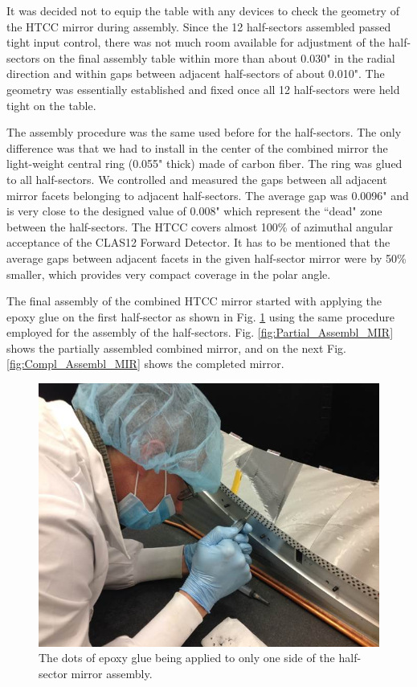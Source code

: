 It was decided not to equip the table with any devices to check the geometry of the HTCC mirror during assembly. Since the 12 half-sectors assembled passed tight input control, there was not much room available for adjustment of the half-sectors on the final assembly table within more than about 0.030" in the radial direction and within gaps between adjacent half-sectors of about 0.010". The geometry was essentially established and fixed once all 12 half-sectors were held tight on the table.

The assembly procedure was the same used before for the half-sectors. The only difference was that we had to install in the center of the combined mirror the light-weight central ring (0.055" thick) made of carbon fiber. The ring was glued to all half-sectors. We controlled and measured the gaps between all adjacent mirror facets belonging to adjacent half-sectors. The average gap was 0.0096" and is very close to the designed value of 0.008" which represent the ``dead" zone between the half-sectors. The HTCC covers almost 100\% of azimuthal angular acceptance of the CLAS12 Forward Detector. It has to be mentioned that the average gaps between adjacent facets in the given half-sector mirror were by 50\% smaller, which provides very compact coverage in the polar angle. 

The final assembly of the combined HTCC mirror started with applying the epoxy glue on the first half-sector as shown in Fig. \ref{fig:Ap_Gl_Half_Sect} using the same procedure employed for the assembly of the half-sectors. Fig. \ref{fig:Partial_Assembl_MIR} shows the partially assembled combined mirror, and on the next Fig. \ref{fig:Compl_Assembl_MIR} shows the completed mirror. 
 
\begin{figure}[ht]
    \centering
    \includegraphics[width=1.0\linewidth]{images/Ap_Gl_Half_Sect.jpg}
    \caption{The dots of epoxy glue being applied to only one side of the half-sector mirror assembly.}
    \label{fig:Ap_Gl_Half_Sect}
\end{figure}
 
